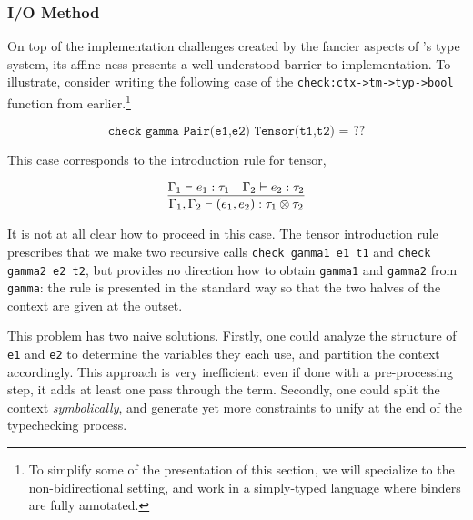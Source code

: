 
\subsubsection{I/O Method}
\label{sec:bilambdaamor-overview-io}
On top of the implementation challenges created by the fancier aspects of \dlambdaamor's type system, its affine-ness presents a well-understood barrier to implementation. To illustrate, consider writing the following case of the \texttt{check:ctx->tm->typ->bool} function from earlier.\footnote{
To simplify some of the presentation of this section, we will specialize to the non-bidirectional setting, and work in a simply-typed language where binders are fully annotated.
}

$$
\texttt{check gamma Pair(e1,e2) Tensor(t1,t2) = } ??
$$

This case corresponds to the introduction rule for tensor,

$$
\infer{\Gamma_1,\Gamma_2 \vdash (e_1,e_2) : \tau_1 \otimes \tau_2}{\Gamma_1 \vdash e_1 : \tau_1 & \Gamma_2 \vdash e_2 : \tau_2}
$$


It is not at all clear how to proceed in this case. The tensor introduction rule prescribes that we make two recursive calls \texttt{check gamma1 e1 t1} and \texttt{check gamma2 e2 t2}, but provides no direction how to obtain \texttt{gamma1} and \texttt{gamma2} from \texttt{gamma}: the rule is presented in the standard way so that the two halves of the context are given at the outset.

This problem has two naive solutions. Firstly, one could analyze the structure of \texttt{e1} and \texttt{e2} to determine the variables they each use, and partition the context accordingly. This approach is very inefficient: even if done with a pre-processing step, it adds at least one pass through the term. Secondly, one could split the context \textit{symbolically}, and generate yet more constraints to unify at the end of the typechecking process.


